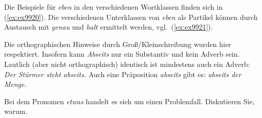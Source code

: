 
Die Beispiele für \textit{eben} in den verschiedenen Wortklassen finden sich in (\ref{ex:ex9920}).
Die verschiedenen Unterklassen von \textit{eben} als Partikel können durch Austausch mit \textit{genau} und \textit{halt} ermittelt werden, vgl.\ (\ref{ex:ex9921}).

\begin{exe}
  \ex \label{ex:ex9920}
  \begin{xlist}
  \end{xlist}
  \ex \label{ex:ex9921}
  \begin{xlist}
  \end{xlist}
\end{exe}


Die orthographischen Hinweise durch Groß/Kleinschreibung wurden hier respektiert.
Insofern kann \textit{Abseits} nur ein Substantiv und \zB kein Adverb sein.
Lautlich (aber nicht orthographisch) identisch ist mindestens auch ein Adverb: \textit{Der Stürmer steht abseits.}
Auch eine Präposition \textit{abseits} gibt es: \textit{abseits der Menge}.

Bei dem Pronomen \textit{etwas} handelt es sich um einen Problemfall.
Diskutieren Sie, warum.


